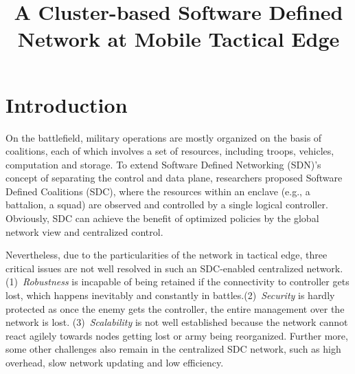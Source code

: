 \documentclass[conference]{IEEEtran}
\begin{document}
\title{A Cluster-based Software Defined Network at Mobile Tactical Edge}

\author{
}



\maketitle





\section{Introduction}
\label{s1}
On the battlefield, military operations are mostly organized on the basis of coalitions, each of which involves a set of resources, including troops, vehicles, computation and storage. To extend Software Defined Networking (SDN)'s concept of separating the control and data plane, researchers proposed Software Defined Coalitions (SDC), where the resources within an enclave (e.g., a battalion, a squad) are observed and controlled by a single logical controller. Obviously, SDC can achieve the benefit of optimized policies by the global network view and centralized control.

Nevertheless, due to the particularities of the network in tactical edge, three critical issues are not well resolved in such an SDC-enabled centralized network. (1)~\emph{Robustness} is incapable of being retained if the connectivity to controller gets lost, which happens inevitably and constantly in battles.(2)~\emph{Security} is hardly protected as once the enemy gets the controller, the entire management over the network is lost. (3)~\emph{Scalability} is not well established because the network cannot react agilely towards nodes getting lost or army being reorganized. Further more, some other challenges also remain in the centralized SDC network, such as high overhead, slow network updating and low efficiency.
\end{document}
